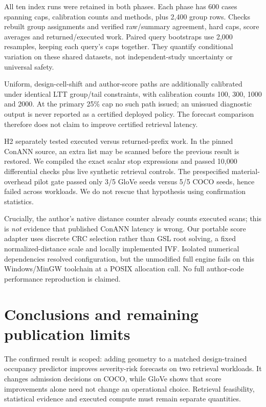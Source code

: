 \documentclass[a4paper,10pt]{esannV2}
\begin{document}
All ten index runs were retained in both phases. Each phase has 600 cases
spanning caps, calibration counts and methods, plus 2,400 group rows. Checks rebuilt
group assignments and verified raw/summary agreement, hard caps, score averages
and returned/executed work. Paired query bootstraps use 2,000 resamples, keeping
each query's caps together. They quantify conditional variation on these shared
datasets, not independent-study uncertainty or universal safety.

Uniform, design-cell-shift and author-score paths are additionally calibrated
under identical LTT group/tail constraints, with calibration counts 100, 300, 1000
and 2000. At the primary 25\% cap no such path issued; an unissued diagnostic output
is never reported as a certified deployed policy. The forecast comparison
therefore does not claim to improve certified retrieval latency.

H2 separately tested executed versus returned-prefix work. In the pinned ConANN
source, an extra list may be scanned before the previous result is restored.
We compiled the exact scalar stop expressions and passed 10,000 differential
checks plus live synthetic retrieval controls. The prespecified material-overhead
pilot gate passed only 3/5 GloVe seeds versus 5/5 COCO seeds, hence failed across
workloads. We do not rescue that hypothesis using confirmation statistics.

Crucially, the author's native distance counter already counts executed scans;
this is \emph{not} evidence that published ConANN latency is wrong. Our portable
score adapter uses discrete CRC selection rather than GSL root solving, a fixed
normalized-distance scale and locally implemented IVF. Isolated numerical
dependencies resolved configuration, but the unmodified full engine fails on
this Windows/MinGW toolchain at a POSIX allocation call. No full author-code
performance reproduction is claimed.

\newpage
\section{Conclusions and remaining publication limits}
The confirmed result is scoped: adding geometry to a matched design-trained
occupancy predictor improves severity-risk forecasts on two retrieval workloads.
It changes admission decisions on COCO, while GloVe shows that score improvements
alone need not change an operational choice. Retrieval feasibility, statistical
evidence and executed compute must remain separate quantities.
\end{document}
